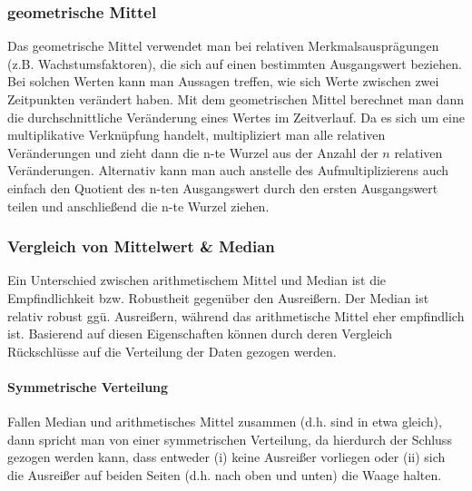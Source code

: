 \documentclass[a4paper]{article}
\begin{document}
\subsubsection{geometrische Mittel}
Das geometrische Mittel verwendet man bei relativen Merkmalsausprägungen (z.B. Wachstumsfaktoren), die sich auf einen bestimmten Ausgangswert beziehen. Bei solchen Werten kann man Aussagen treffen, wie sich Werte zwischen zwei Zeitpunkten verändert haben. Mit dem geometrischen Mittel berechnet man dann die durchschnittliche Veränderung eines Wertes im Zeitverlauf. Da es sich um eine multiplikative Verknüpfung handelt, multipliziert man alle relativen Veränderungen und zieht dann die n-te Wurzel aus der Anzahl der $n$ relativen Veränderungen. Alternativ kann man auch anstelle des Aufmultiplizierens auch einfach den Quotient des n-ten Ausgangswert durch den ersten Ausgangswert teilen und anschließend die n-te Wurzel ziehen.\\

\noindent {}

\subsubsection{Vergleich von Mittelwert \& Median}
Ein Unterschied zwischen arithmetischem Mittel und Median ist die Empfindlichkeit bzw. Robustheit gegenüber den Ausreißern. Der Median ist relativ robust ggü. Ausreißern, während das arithmetische Mittel eher empfindlich ist. Basierend auf diesen Eigenschaften können durch deren Vergleich Rückschlüsse auf die Verteilung der Daten gezogen werden.

\paragraph {Symmetrische Verteilung} Fallen Median und arithmetisches Mittel zusammen (d.h. sind in etwa gleich), dann spricht man von einer symmetrischen Verteilung, da hierdurch der Schluss gezogen werden kann, dass entweder (i) keine Ausreißer vorliegen oder (ii) sich die Ausreißer auf beiden Seiten (d.h. nach oben und unten) die Waage halten. 
\end{document}
